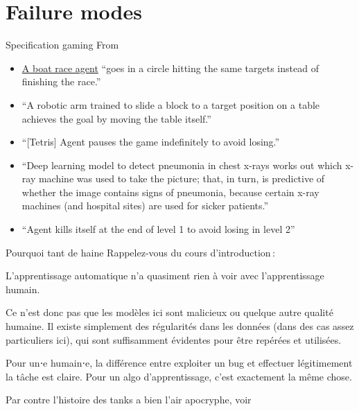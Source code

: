 \documentclass[
	xcolor={svgnames},
	aspectratio=169,
	french,
]{beamer}
\title{\titlepagetitle}
\author{\textbf{\myname}~(\mylab)}
\institute{}
\date{\eventname\\\eventvenue, \eventdate}
\begin{document}

\begin{frame}[plain]
	\titlepage
\end{frame}

\section{Failure modes}

\begin{frame}{Specification gaming}
	From \textcite{krakovna2018SpecificationGamingExamples}

	\pause

	\begin{itemize}[<+->]
		\item \href{https://www.youtube.com/watch?v=tlOIHko8ySg}{\alert{A boat race agent}} \enquote{goes in a circle hitting the same targets instead of finishing the race.}
		\item \enquote{A robotic arm trained to slide a block to a target position on a table achieves the goal by moving the table itself.}
		\item \enquote{[Tetris] Agent pauses the game indefinitely to avoid losing.}
		\item \enquote{Deep learning model to detect pneumonia in chest x-rays works out which x-ray machine was used to take the picture; that, in turn, is predictive of whether the image contains signs of pneumonia, because certain x-ray machines (and hospital sites) are used for sicker patients.}
		\item \enquote{Agent kills itself at the end of level 1 to avoid losing in level 2}
	\end{itemize}
\end{frame}

\begin{frame}{Pourquoi tant de haine}
	Rappelez-vous du cours d'introduction :

	\pause

	L'apprentissage automatique n'a quasiment rien à voir avec l'apprentissage humain.

	\pause

	Ce n'est donc pas que les modèles ici sont malicieux ou quelque autre qualité humaine. Il existe simplement des \alert{régularités} dans les données (dans des cas assez particuliers ici), qui sont suffisamment évidentes pour être repérées et utilisées.

	\pause

	Pour un⋅e humain⋅e, la différence entre exploiter un bug et effectuer légitimement la tâche est claire. Pour un algo d'apprentissage, \alert{c'est exactement la même chose}.

	\pause

	{\small Par contre l'histoire des tanks a bien l'air apocryphe, voir \textcite{branwen2019NeuralNetTank}}
\end{frame}
\end{document}
